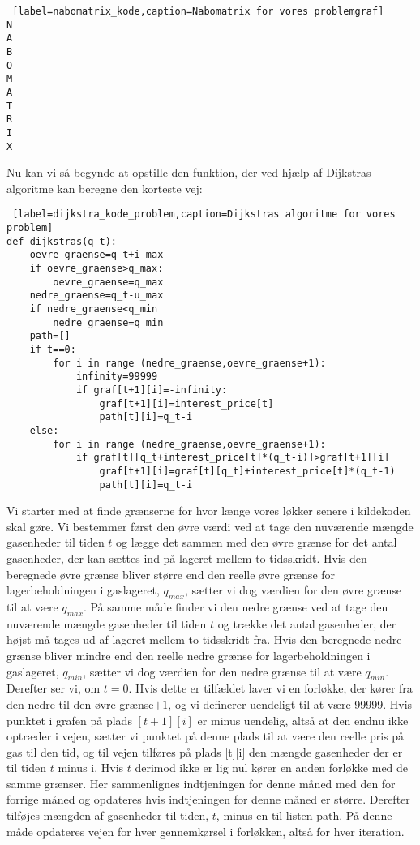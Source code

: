 \begin{lstlisting} [label=nabomatrix_kode,caption=Nabomatrix for vores problemgraf]
N
A
B
O
M
A
T
R
I
X
\end{lstlisting}

Nu kan vi så begynde at opstille den funktion, der ved hjælp af Dijkstras algoritme kan beregne den korteste vej:

\begin{lstlisting} [label=dijkstra_kode_problem,caption=Dijkstras algoritme for vores problem]
def dijkstras(q_t):
	oevre_graense=q_t+i_max
	if oevre_graense>q_max:
		oevre_graense=q_max
	nedre_graense=q_t-u_max
	if nedre_graense<q_min
		nedre_graense=q_min
	path=[]	
	if t==0:
		for i in range (nedre_graense,oevre_graense+1):
			infinity=99999
			if graf[t+1][i]=-infinity:
				graf[t+1][i]=interest_price[t]
				path[t][i]=q_t-i
	else:
		for i in range (nedre_graense,oevre_graense+1):
			if graf[t][q_t+interest_price[t]*(q_t-i)]>graf[t+1][i]
				graf[t+1][i]=graf[t][q_t]+interest_price[t]*(q_t-1)
				path[t][i]=q_t-i
\end{lstlisting}

Vi starter med at finde grænserne for hvor længe vores løkker senere i kildekoden skal gøre. Vi bestemmer først den øvre værdi ved at tage den nuværende mængde gasenheder til tiden $t$ og lægge det sammen med den øvre grænse for det antal gasenheder, der kan sættes ind på lageret mellem to tidsskridt. Hvis den beregnede øvre grænse bliver større end den reelle øvre grænse for lagerbeholdningen i gaslageret, $q_{max}$, sætter vi dog værdien for den øvre grænse til at være $q_{max}$. På samme måde finder vi den nedre grænse ved at tage den nuværende mængde gasenheder til tiden $t$ og trække det antal gasenheder, der højst må tages ud af lageret mellem to tidsskridt fra. Hvis den beregnede nedre grænse bliver mindre end den reelle nedre grænse for lagerbeholdningen i gaslageret, $q_{min}$, sætter vi dog værdien for den nedre grænse til at være $q_{min}$. Derefter ser vi, om $t=0$. Hvis dette er tilfældet laver vi en forløkke, der kører fra den nedre til den øvre grænse$+1$, og vi definerer uendeligt til at være 99999. Hvis punktet i grafen på plads $[t+1][i]$ er minus uendelig, altså at den endnu ikke optræder i vejen, sætter vi punktet på denne plads til at være den reelle pris på gas til den tid, og til vejen tilføres på plads [t][i] den mængde gasenheder der er til tiden $t$ minus i. Hvis $t$ derimod ikke er lig nul kører en anden forløkke med de samme grænser. Her sammenlignes indtjeningen for denne måned med den for forrige måned og opdateres hvis indtjeningen for denne måned er større. Derefter tilføjes mængden af gasenheder til tiden, $t$, minus en til listen path. På denne måde opdateres vejen for hver gennemkørsel i forløkken, altså for hver iteration.